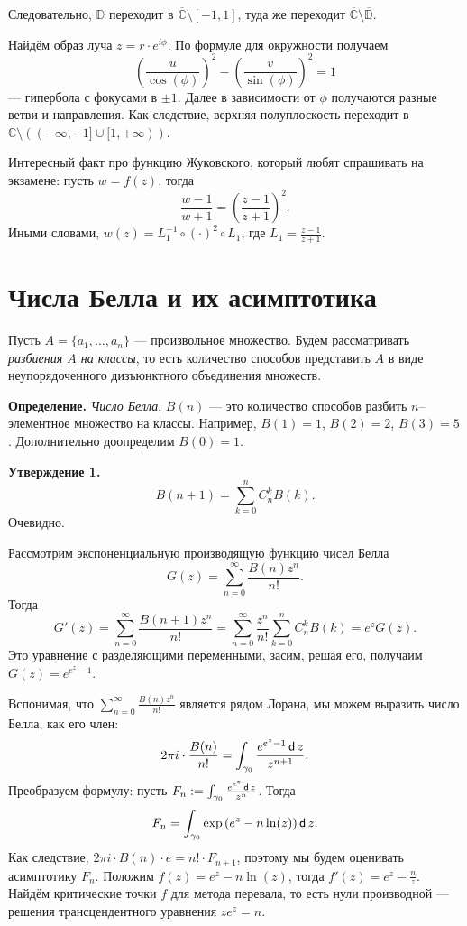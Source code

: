 \begin{itemize}
        Следовательно, $\mathbb D$ переходит в $\overline{\mathbb C} \setminus [-1, 1]$, туда же переходит $\overline{\mathbb C} \setminus \overline{\mathbb D}$.

        Найдём образ луча $z = r \cdot e^{i\phi}$.
        По формуле для окружности получаем
        \[
            \left( \frac{u}{\cos(\phi)} \right)^2 - \left( \frac{v}{\sin(\phi)} \right)^2 = 1
        \]
        --- гипербола с фокусами в $\pm 1$.
        Далее в зависимости от $\phi$ получаются разные ветви и направления.
        Как следствие, верхняя полуплоскость переходит в $\mathbb C \setminus ((-\infty, -1] \cup [1, +\infty))$.

        Интересный факт про функцию Жуковского, который любят спрашивать на экзамене: пусть $w = f(z)$, тогда
        \[
            \frac{w - 1}{w + 1} = \left( \frac{z-1}{z+1} \right)^2.
        \]
        Иными словами, $w(z) = L_1^{-1} \circ (\cdot)^2 \circ L_1$, где $L_1 = \frac{z - 1}{z + 1}$.
\end{itemize}

\section{Числа Белла и их асимптотика}
Пусть $A = \{a_1, \dots, a_n\}$ --- произвольное множество.
Будем рассматривать \textit{разбиения $A$ на классы}, то есть количество способов представить $A$ в виде неупорядоченного дизъюнктного объединения множеств.

\textbf{Определение.} \textit{Число Белла}, $B(n)$ --- это количество способов разбить $n$--элементное множество на классы.
Например, $B(1) = 1$, $B(2) = 2$, $B(3) = 5$.
Дополнительно доопределим $B(0) = 1$.

\textbf{Утверждение 1.}
\[
    B(n + 1) = \sum_{k=0}^{n} C_n^k B(k).
\]
Очевидно.

Рассмотрим экспоненциальную производящую функцию чисел Белла
\[
    G(z) = \sum_{n=0}^{\infty} \frac{B(n) z^n}{n!}.
\]
Тогда
\[
    G'(z) = \sum_{n=0}^{\infty} \frac{B(n + 1) z^n}{n!} = \sum_{n=0}^{\infty} \frac{z^n}{n!} \sum_{k=0}^{n} C_n^k B(k) = e^z G(z).
\]
Это уравнение с разделяющими переменными, засим, решая его, получаим $G(z) = e^{e^z - 1}$.

Вспонимая, что $\sum_{n=0}^{\infty} \frac{B(n) z^n}{n!}$ является рядом Лорана, мы можем выразить число Белла, как его член:
\[
    2\pi i \cdot \frac{B(n)}{n!} = \int_{\gamma_0} \frac{e^{e^z - 1} \operatorname{\mathsf d} z}{z^{n+1}}.
\]
Преобразуем формулу: пусть $F_n := \int_{\gamma_0} \frac{e^{e^z} \operatorname{\mathsf d} z}{z^n}$.
Тогда
\[
    F_n = \int_{\gamma_0} \exp \left(e^z - n \ln(z) \right) \operatorname{\mathsf d} z.
\]
Как следствие, $2\pi i \cdot B(n) \cdot e = n! \cdot F_{n+1}$, поэтому мы будем оценивать асимптотику $F_n$.
Положим $f(z) = e^z - n \ln(z)$, тогда $f'(z) = e^z - \frac{n}{z}$.
Найдём критические точки $f$ для метода перевала, то есть нули производной --- решения трансцендентного уравнения $z e^z = n$.

